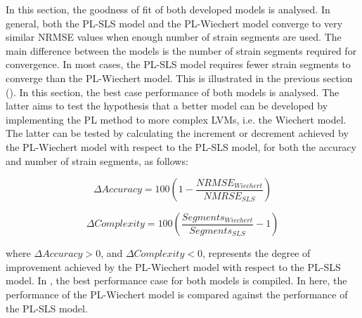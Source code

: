 In this section, the goodness of fit of both developed models is analysed. In general, both the PL-SLS model and the PL-Wiechert model converge to very similar NRMSE values when enough number of strain segments are used. The main difference between the models is the number of strain segments required for convergence. In most cases, the PL-SLS model requires fewer strain segments to converge than the PL-Wiechert model. This is illustrated in the previous section (). In this section, the best case performance of both models is analysed. The latter aims to test the hypothesis that a better model can be developed by implementing the PL method to more complex LVMs, i.e. the Wiechert model. The latter can be tested by calculating the increment or decrement achieved by the PL-Wiechert model with respect to the PL-SLS model, for both the accuracy and number of strain segments, as follows:

\begin{equation}
	\Delta Accuracy = 100\left(1 - \frac{NRMSE_{Wiechert}}{NMRSE_{SLS}} \right)
\end{equation}

\begin{equation}
	\Delta Complexity = 100\left( \frac{Segments_{Wiechert}}{Segments_{SLS}} - 1 \right)
\end{equation}

\noindent where $\Delta Accuracy > 0$, and $\Delta Complexity < 0$, represents the degree of improvement achieved by the PL-Wiechert model with respect to the PL-SLS model. In , the best performance case for both models is compiled. In here, the performance of the PL-Wiechert model is compared against the performance of the PL-SLS model.

